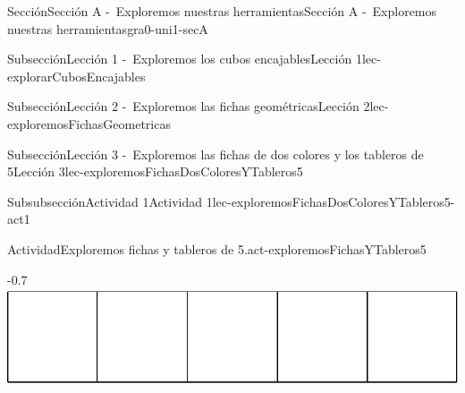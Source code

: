 \begin{sectionptx}{Sección}{Sección A -~Exploremos nuestras herramientas}{}{Sección A -~Exploremos nuestras herramientas}{}{}{gra0-uni1-secA}
%
%
\typeout{************************************************}
\typeout{************************************************}
%
\begin{subsectionptx}{Subsección}{Lección 1 -~Exploremos los cubos encajables}{}{Lección 1}{}{}{lec-explorarCubosEncajables}
\end{subsectionptx}
%
%
\typeout{************************************************}
\typeout{************************************************}
%
\begin{subsectionptx}{Subsección}{Lección 2 -~Exploremos las fichas geométricas}{}{Lección 2}{}{}{lec-exploremosFichasGeometricas}
\end{subsectionptx}
%
%
\typeout{************************************************}
\typeout{************************************************}
%
\begin{subsectionptx}{Subsección}{Lección 3 -~Exploremos las fichas de dos colores y los tableros de 5}{}{Lección 3}{}{}{lec-exploremosFichasDosColoresYTableros5}
%
%
\typeout{************************************************}
\typeout{************************************************}
%
\cleardoublepage
\begin{subsubsectionptx}{Subsubsección}{Actividad 1}{}{Actividad 1}{}{}{lec-exploremosFichasDosColoresYTableros5-act1}
\begin{activity}{Actividad}{Exploremos fichas y tableros de 5.}{act-exploremosFichasYTableros5}%
\begin{image}{0}{1}{0}{-0.7\baselineskip}%
\includegraphics[max width=\linewidth, center]{external/svg-source/tikz-file-148144.pdf}
\end{image}%
\begin{cutoutpage}

\end{cutoutpage}
\end{activity}
\end{subsubsectionptx}
\end{subsectionptx}
\end{sectionptx}
